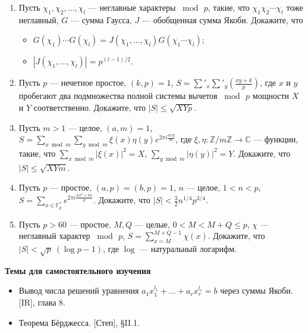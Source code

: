 \documentclass[a4paper, 11pt]{article}
\begin{document}
\begin{enumerate}[topsep=0pt]
    \item Пусть $\chi_1, \chi_2, \dots, \chi_l$ --- неглавные характеры $\bmod\, p$, такие, что $\chi_1 \chi_2 \cdots \chi_l$ тоже неглавный, $G$ --- сумма Гаусса, $J$ --- обобщенная сумма Якоби. Докажите, что
    \begin{itemize}[noitemsep,topsep=0pt]
        \item $G(\chi_1) \cdots G(\chi_l) = J(\chi_1, \dots, \chi_l) G(\chi_1 \cdots \chi_l)$;
        \item $|J(\chi_1, \dots, \chi_l)| = p^{(l-1)/2}$.
    \end{itemize} %

    \item Пусть $p$ --- нечетное простое, $(k,p)=1$, $S=\sum'_x \sum'_y \left(\frac{xy+k}{p}\right)$, где $x$ и $y$ пробегают два подмножества полной системы вычетов $\bmod\, p$ мощности $X$ и $Y$ соответственно. Докажите, что $|S|\leqslant\sqrt{XYp}$. %

    \item Пусть $m>1$ --- целое, $(a,m)=1$, $S=\sum\limits_{x \bmod m}\sum\limits_{y \bmod m} \xi(x) \eta(y) e^{2\pi i \frac{axy}{m}}$, где $\xi,\eta\colon\mathbb{Z}/m\mathbb{Z}\to\mathbb{C}$ --- функции, такие, что $\sum\limits_{x \bmod m} |\xi(x)|^2=X$, $\sum\limits_{y \bmod m} |\eta(y)|^2=Y$. Докажите, что $|S|\leqslant\sqrt{XYm}$. %

    \item Пусть $p$ --- простое, $(a,p)=(b,p)=1$, $n$ --- целое, $1<n<p$, $S=\sum\limits_{x \in \mathbb{F}_p^*} e^{2\pi i \frac{ax^n+bx}{p}}$. Докажите, что $|S| < \frac{3}{2} n^{1/4} p^{3/4}$. %

    \item Пусть $p>60$ --- простое, $M,Q$ --- целые, $0<M<M+Q\leqslant p$, $\chi$ --- неглавный характер $\bmod\, p$, $S = \sum\limits_{x=M}^{M+Q-1} \chi(x)$. Докажите, что $|S|<\sqrt{p}\ (\log p - 1)$, где $\log$ --- натуральный логарифм. %
  
\end{enumerate}


\noindent\textbf{Темы для самостоятельного изучения}

\begin{itemize}[topsep=0pt]
    \item Вывод числа решений уравнения $a_1 x_1^{l_1} + \dots + a_r x_r^{l_r}=b$ через суммы Якоби. [IR], глава 8.
    \item Теорема Бёрджесса. [Степ], \S II.1.
\end{itemize}
\end{document}
